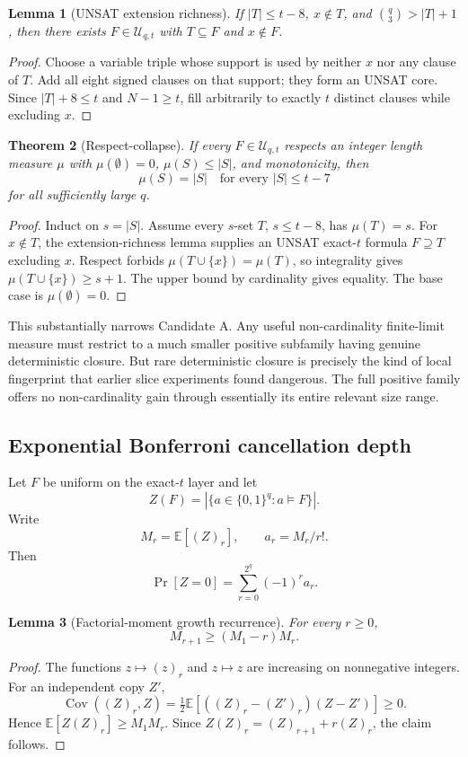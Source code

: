 \documentclass[11pt]{article}
\newtheorem{theorem}{Theorem}
\newtheorem{lemma}[theorem]{Lemma}
\begin{document}
\begin{lemma}[UNSAT extension richness]
If $|T|\le t-8$, $x\notin T$, and $\binom q3>|T|+1$, then there exists $F\in\mathcal U_{q,t}$ with $T\subseteq F$ and $x\notin F$.
\end{lemma}
\begin{proof}
Choose a variable triple whose support is used by neither $x$ nor any clause of $T$. Add all eight signed clauses on that support; they form an UNSAT core. Since $|T|+8\le t$ and $N-1\ge t$, fill arbitrarily to exactly $t$ distinct clauses while excluding $x$.
\end{proof}

\begin{theorem}[Respect-collapse]
If every $F\in\mathcal U_{q,t}$ respects an integer length measure $\mu$ with $\mu(\emptyset)=0$, $\mu(S)\le|S|$, and monotonicity, then
\[\boxed{\mu(S)=|S|\quad\text{for every }|S|\le t-7}\]
for all sufficiently large $q$.
\end{theorem}
\begin{proof}
Induct on $s=|S|$. Assume every $s$-set $T$, $s\le t-8$, has $\mu(T)=s$. For $x\notin T$, the extension-richness lemma supplies an UNSAT exact-$t$ formula $F\supseteq T$ excluding $x$. Respect forbids $\mu(T\cup\{x\})=\mu(T)$, so integrality gives $\mu(T\cup\{x\})\ge s+1$. The upper bound by cardinality gives equality. The base case is $\mu(\emptyset)=0$.
\end{proof}

This substantially narrows Candidate A. Any useful non-cardinality finite-limit measure must restrict to a much smaller positive subfamily having genuine deterministic closure. But rare deterministic closure is precisely the kind of local fingerprint that earlier slice experiments found dangerous. The full positive family offers no non-cardinality gain through essentially its entire relevant size range.

\subsection{Exponential Bonferroni cancellation depth}
Let $F$ be uniform on the exact-$t$ layer and let
\[Z(F)=|\{a\in\{0,1\}^q:a\models F\}|.\]
Write
\[M_r=\mathbb E[(Z)_r],\qquad a_r=M_r/r!.\]
Then
\[\Pr[Z=0]=\sum_{r=0}^{2^q}(-1)^r a_r.\]

\begin{lemma}[Factorial-moment growth recurrence]
For every $r\ge0$,
\[M_{r+1}\ge(M_1-r)M_r.\]
\end{lemma}
\begin{proof}
The functions $z\mapsto(z)_r$ and $z\mapsto z$ are increasing on nonnegative integers. For an independent copy $Z'$,
\[\operatorname{Cov}((Z)_r,Z)=\tfrac12\mathbb E[((Z)_r-(Z')_r)(Z-Z')]\ge0.\]
Hence $\mathbb E[Z(Z)_r]\ge M_1M_r$. Since $Z(Z)_r=(Z)_{r+1}+r(Z)_r$, the claim follows.
\end{proof}
\end{document}
